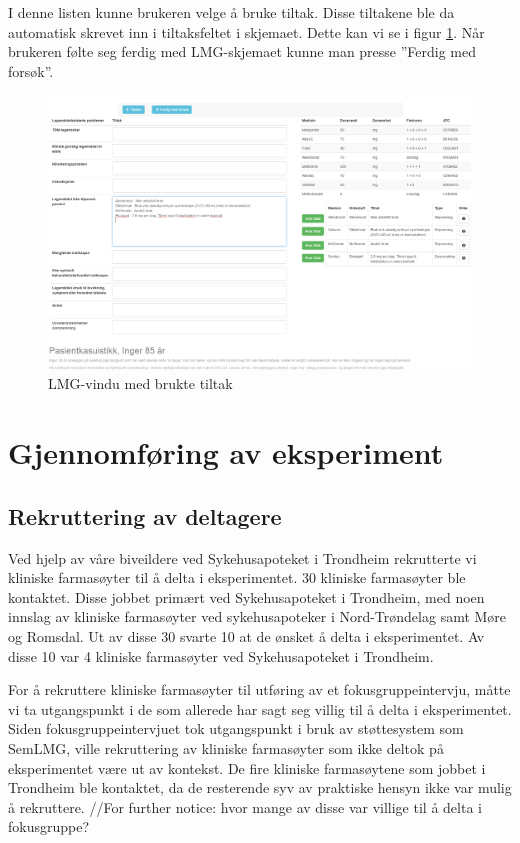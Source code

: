 \newpage
 I denne listen kunne brukeren velge å bruke tiltak. Disse tiltakene ble da automatisk skrevet inn i tiltaksfeltet i skjemaet. Dette kan vi se i figur \ref{fig:demo6}. Når brukeren følte seg ferdig med LMG-skjemaet kunne man presse ''Ferdig med forsøk''.
\begin{figure}[H]
\begin{center}
\includegraphics[width=18cm]{images/demoimages/6}
\caption{LMG-vindu med brukte tiltak}
\label{fig:demo6}
\end{center}
\end{figure}

\newpage



\section{Gjennomføring av eksperiment}
\label{chap:gjenomf_eksperiment}
\subsection{Rekruttering av deltagere}
Ved hjelp av våre biveildere ved Sykehusapoteket i Trondheim rekrutterte vi kliniske farmasøyter til å delta i eksperimentet. 30 kliniske farmasøyter ble kontaktet. Disse jobbet primært ved Sykehusapoteket i Trondheim, med noen innslag av kliniske farmasøyter ved sykehusapoteker i Nord-Trøndelag samt Møre og Romsdal. Ut av disse 30 svarte 10 at de ønsket å delta i eksperimentet. Av disse 10 var 4 kliniske farmasøyter ved Sykehusapoteket i Trondheim. 

For å rekruttere kliniske farmasøyter til utføring av et fokusgruppeintervju, måtte vi ta utgangspunkt i de som allerede har sagt seg villig til å delta i eksperimentet. Siden fokusgruppeintervjuet tok utgangspunkt i bruk av støttesystem som SemLMG, ville rekruttering av kliniske farmasøyter som ikke deltok på eksperimentet være ut av kontekst. De fire kliniske farmasøytene som jobbet i Trondheim ble kontaktet, da de resterende syv av praktiske hensyn ikke var mulig å rekruttere.
//For further notice: hvor mange av disse var villige til å delta i fokusgruppe?

